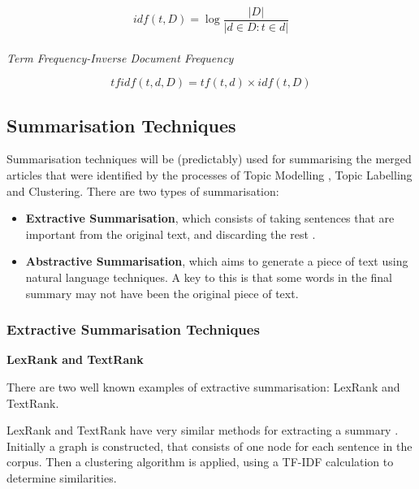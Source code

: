 \documentclass[12pt]{article}
\begin{document}
\[idf(t,D) = \log{\frac{\left|D\right|}{\left|d \in D : t \in d\right|}} \] \\

\emph{Term Frequency-Inverse Document Frequency}

\[tfidf(t,d,D) = tf(t,d) \times idf(t,D)\] 

\subsection{Summarisation Techniques} 

\label{summarisation}      

Summarisation techniques will be (predictably) used for summarising the merged articles that were identified by the processes of Topic Modelling , Topic Labelling and Clustering. There are two types of summarisation: 

\begin{itemize}
	\item \textbf{Extractive Summarisation}, which consists of taking sentences that are important from the original text, and discarding the rest \cite{extractiveTechniques}. 
	\item \textbf{Abstractive Summarisation}, which aims to generate a piece of text using natural language techniques. A key to this is that some words in the final summary may not have been the original piece of text.
\end{itemize}

\subsubsection{Extractive Summarisation Techniques}

\label{extractiveSummarisation}

\textbf{LexRank and TextRank}

There are two well known examples of extractive summarisation: LexRank and TextRank.

LexRank and TextRank have very similar methods for extracting a summary \cite{lexRank}. Initially a graph is constructed, that consists of one node for each sentence in the corpus. Then a clustering algorithm is applied, using a TF-IDF calculation to determine similarities. 
\end{document}
